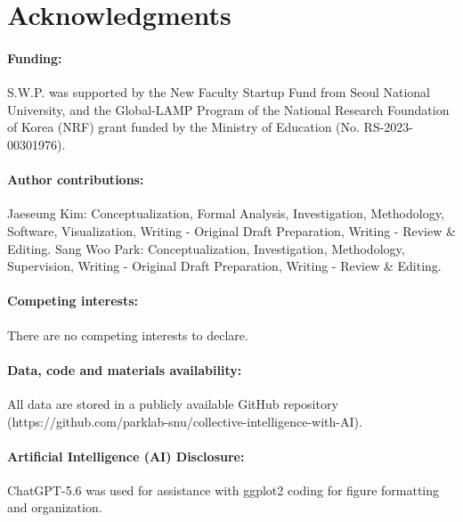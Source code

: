 \documentclass[12pt]{article}
\begin{document}
\section*{Acknowledgments}

\paragraph*{Funding:}
S.W.P. was supported by the New Faculty Startup Fund from Seoul National University,
and the Global-LAMP Program of the National Research Foundation of Korea (NRF) grant funded by the Ministry of Education (No. RS-2023-00301976).
\paragraph*{Author contributions:}
Jaeseung Kim: Conceptualization, Formal Analysis, Investigation, Methodology, Software, Visualization, Writing - Original Draft Preparation, Writing - Review \& Editing.
Sang Woo Park: Conceptualization, Investigation, Methodology, Supervision, Writing - Original Draft Preparation, Writing - Review \& Editing.
\paragraph*{Competing interests:}
There are no competing interests to declare.
\paragraph*{Data, code and materials availability:}
All data are stored in a publicly available GitHub repository (https://github.com/parklab-snu/collective-intelligence-with-AI).
\paragraph*{Artificial Intelligence (AI) Disclosure:}
ChatGPT-5.6 was used for assistance with ggplot2 coding for figure formatting and organization.

\pagebreak


\end{document}
